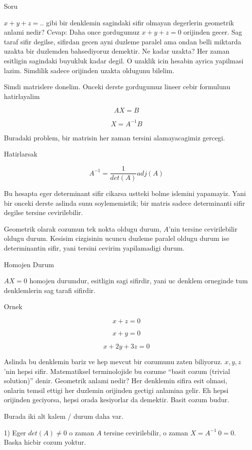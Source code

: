 \documentclass[12pt,fleqn]{article}
\begin{document}
Soru

$x + y + z = ..$ gibi bir denklemin sagindaki sifir olmayan degerlerin
geometrik anlami nedir? Cevap: Daha once gordugumuz $x + y + z = 0$
orijinden gecer. Sag taraf sifir degilse, sifirdan gecen ayni duzleme
paralel ama ondan belli miktarda uzakta bir duzlemden bahsediyoruz
demektir. Ne kadar uzakta? Her zaman esitligin sagindaki buyukluk kadar
degil. O uzaklik icin hesabin ayrica yapilmasi lazim. Simdilik sadece
orijinden uzakta oldugunu bilelim. 

Simdi matrislere donelim. Onceki derste gordugumuz lineer cebir formulunu
hatirlayalim

\[ AX = B \]

\[ X = A^{-1}B \]

Buradaki problem, bir matrisin her zaman tersini alamayacagimiz gercegi. 

Hatirlarsak 

\[ A^{-1} = \frac{1}{det(A)}adj(A) \]

Bu hesapta eger determinant sifir cikarsa ustteki bolme islemini
yapamayiz. Yani bir onceki derste aslinda sunu soylememistik; bir matris
sadece determinanti sifir degilse tersine cevirilebilir. 

Geometrik olarak cozumun tek nokta oldugu durum, $A$'nin tersine
cevirilebilir oldugu durum. Kesisim cizgisinin ucuncu duzleme paralel
oldugu durum ise determinantin sifir, yani tersini cevirim yapilamadigi
durum. 

Homojen Durum

$AX = 0$ homojen durumdur, esitligin sagi sifirdir, yani uc denklem
orneginde tum denklemlerin sag tarafi sifirdir. 

Ornek

\[ x + z = 0 \]

\[ x + y = 0 \]

\[ x + 2y + 3z = 0 \]

Aslinda bu denklemin bariz ve hep mevcut bir cozumunu zaten
biliyoruz. $x,y,z$'nin hepsi sifir. Matematiksel terminolojide bu cozume
``basit cozum (trivial solution)'' denir. Geometrik anlami nedir? Her
denklemin sifira esit olmasi, onlarin temsil ettigi her duzlemin orijinden
gectigi anlamina gelir. Eh hepsi orijinden geciyorsa, hepsi orada
kesiyorlar da demektir. Basit cozum budur. 

Burada iki alt kalem / durum daha var. 

1) Eger $det(A) \ne 0$ o zaman $A$ tersine cevirilebilir, o zaman $X =
A^{-1} \ 0 = 0$. 
Baska hicbir cozum yoktur.
\end{document}
